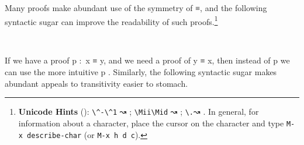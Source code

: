 Many proofs make abundant use of the symmetry of \ad ≡, and the following syntactic sugar can improve the readability of such proofs.\footnote{%
\textbf{Unicode Hints} (\agdamode): \texttt{\textbackslash{}\^{}-\textbackslash{}\^{}1} ↝ ; \texttt{\textbackslash{}Mii\textbackslash{}Mid} ↝ ; \texttt{\textbackslash{}.}↝ . In general, for information about a character, place the cursor on the character and type \texttt{M-x\ describe-char} (or \texttt{M-x\ h\ d\ c}).}
\ccpad
\begin{code}
\>[1]\AgdaSpace{}%
\AgdaSymbol{:}\AgdaSpace{}%
\AgdaSymbol{\{}\AgdaSpace{}%
\AgdaSymbol{:}\AgdaSpace{}%
\AgdaSpace{}%
\AgdaSpace{}%
\AgdaSymbol{\}}\AgdaSpace{}%
\AgdaSpace{}%
\AgdaSymbol{\{}\AgdaSpace{}%
\AgdaSpace{}%
\AgdaSymbol{:}\AgdaSpace{}%
\AgdaSymbol{\}}\AgdaSpace{}%
\AgdaSpace{}%
\AgdaSpace{}%
\AgdaSpace{}%
\AgdaSpace{}%
\AgdaSpace{}%
\AgdaSpace{}%
\AgdaSpace{}%
\<%
\\
%
\>[1]\AgdaSpace{}%
\AgdaSpace{}%
\AgdaSymbol{=}\AgdaSpace{}%
\AgdaSpace{}%
\<%
\end{code}
\ccpad
If we have a proof \ab p \as :~\ab x \aod ≡ \ab y, and we need a proof of \ab y \aod ≡ \ab x, then instead of  \ab p we can use the more intuitive \ab p . Similarly, the following syntactic sugar makes abundant appeals to transitivity easier to stomach.
\ccpad
